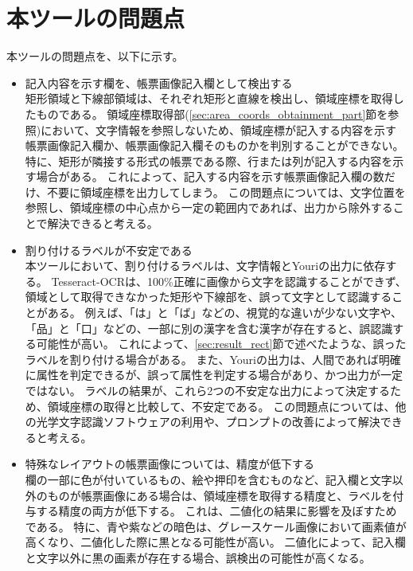 \section{本ツールの問題点}\label{sec:problems}
本ツールの問題点を、以下に示す。

\begin{itemize}
    \item 記入内容を示す欄を、帳票画像記入欄として検出する\\
        矩形領域と下線部領域は、それぞれ矩形と直線を検出し、領域座標を取得したものである。
        領域座標取得部(\ref{sec:area_coords_obtainment_part}節を参照)において、文字情報を参照しないため、領域座標が記入する内容を示す帳票画像記入欄か、帳票画像記入欄そのものかを判別することができない。
        特に、矩形が隣接する形式の帳票である際、行または列が記入する内容を示す場合がある。
        これによって、記入する内容を示す帳票画像記入欄の数だけ、不要に領域座標を出力してしまう。
        この問題点については、文字位置を参照し、領域座標の中心点から一定の範囲内であれば、出力から除外することで解決できると考える。
    \item 割り付けるラベルが不安定である\\
        本ツールにおいて、割り付けるラベルは、文字情報とYouriの出力に依存する。
        Tesseract-OCRは、100\%正確に画像から文字を認識することができず、領域として取得できなかった矩形や下線部を、誤って文字として認識することがある。
        例えば、「は」と「ば」などの、視覚的な違いが少ない文字や、「品」と「口」などの、一部に別の漢字を含む漢字が存在すると、誤認識する可能性が高い。
        これによって、\ref{sec:result_rect}節で述べたような、誤ったラベルを割り付ける場合がある。
        また、Youriの出力は、人間であれば明確に属性を判定できるが、誤って属性を判定する場合があり、かつ出力が一定ではない。
        ラベルの結果が、これら2つの不安定な出力によって決定するため、領域座標の取得と比較して、不安定である。 
        この問題点については、他の光学文字認識ソフトウェアの利用や、プロンプトの改善によって解決できると考える。
    \item 特殊なレイアウトの帳票画像については、精度が低下する\\
        欄の一部に色が付いているもの、絵や押印を含むものなど、記入欄と文字以外のものが帳票画像にある場合は、領域座標を取得する精度と、ラベルを付与する精度の両方が低下する。
        これは、二値化の結果に影響を及ぼすためである。
        特に、青や紫などの暗色は、グレースケール画像において画素値が高くなり、二値化した際に黒となる可能性が高い。
        二値化によって、記入欄と文字以外に黒の画素が存在する場合、誤検出の可能性が高くなる。

\end{itemize}
